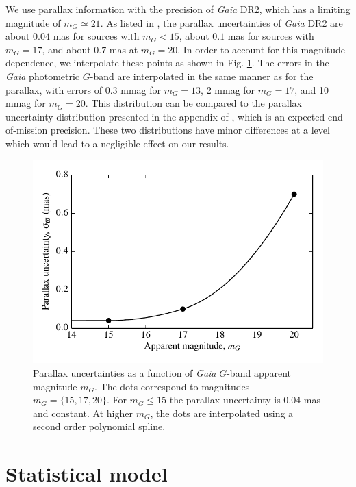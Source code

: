 \documentclass[fleqn,usenatbib]{mnras}
\begin{document}
We use parallax information with the precision of \emph{Gaia} DR2, which has a limiting magnitude of $m_G \simeq 21$. As listed in \cite{2018arXiv180409366L}, the parallax uncertainties of \emph{Gaia} DR2 are about $0.04$ mas for sources with $m_G<15$, about $0.1$ mas for sources with $m_G=17$, and about $0.7$ mas at $m_G=20$. In order to account for this magnitude dependence, we interpolate these points as shown in Fig. \ref{fig:parallax_error}. The errors in the \emph{Gaia} photometric $G$-band are interpolated in the same manner as for the parallax, with errors of 0.3 mmag for $m_G = 13$, 2 mmag for $m_G = 17$, and 10 mmag for $m_G = 20$. This distribution can be compared to the parallax uncertainty distribution presented in the appendix of \cite{2018A&A...616A...9L}, which is an expected end-of-mission precision. These two distributions have minor differences at a level which would lead to a negligible effect on our results.

\begin{figure}
	\includegraphics[width=\columnwidth]{parallax_error.pdf}
    \caption{Parallax uncertainties as a function of \emph{Gaia} $G$-band apparent magnitude $m_G$. The dots correspond to magnitudes $m_G=\{15,17,20\}$. For $m_G\leq 15$ the parallax uncertainty is 0.04 mas and constant. At higher $m_G$, the dots are interpolated using a second order polynomial spline.}
    \label{fig:parallax_error}
\end{figure}





\section{Statistical model}\label{sec:method}
\end{document}
